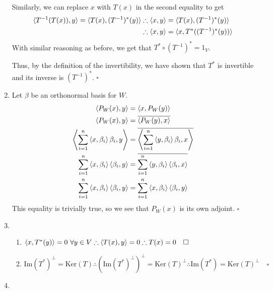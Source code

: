 \documentclass[12pt]{article}
\begin{document}
\begin{enumerate}
            Similarly, we can replace $x$ with $T(x)$ in the second equality to get
            \begin{align*}
                  \braket{T^{-1}(T(x)), y}=\braket{T(x), (T^{-1})^*(y)} & \therefore \braket{x, y}=\braket{T(x), (T^{-1})^*(y)}   \\
                                                                        & \therefore \braket{x, y}=\braket{x, T^*((T^{-1})^*(y))}
            \end{align*}
            With similar reasoning as before, we get that $T^* \circ (T^{-1})^*=\mathrm{1}_V$.

            Thus, by the definition of the invertibility, we have shown that $T^*$ is invertible
            and its inverse is $(T^{-1})^*$. $\square$

      \item Let $\beta$ be an orthonormal basis for $W$.
            \begin{gather*}
                  \braket{P_W(x), y} = \braket{x, P_W(y)} \\
                  \braket{P_W(x), y} = \overline{\braket{P_W(y), x}} \\
                  \Braket{\sum_{i=1}^{n} \braket{x, \beta_i}\beta_i, y} = \overline{\Braket{\sum_{i=1}^{n} \braket{y, \beta_i}\beta_i, x}} \\
                  \sum_{i=1}^{n} \braket{x, \beta_i}\braket{\beta_i, y} = \overline{\sum_{i=1}^{n} \braket{y, \beta_i}\braket{\beta_i, x}} \\
                  \sum_{i=1}^{n} \braket{x, \beta_i}\braket{\beta_i, y} = \sum_{i=1}^{n} \braket{x, \beta_i}\braket{\beta_i, y}
            \end{gather*}
            This equality is trivially true, so we see that $P_W(x)$ is its own adjoint. $\square$
      \item \begin{enumerate}
                  \item $\braket{x, T^*(y)}=0\ \forall y \in V \therefore \braket{T(x), y}=0 \therefore T(x)=0\quad\square$
                  \item $\text{Im}(T^*)^\perp = \text{Ker}(T) \therefore (\text{Im}(T^*)^\perp)^\perp = \text{Ker}(T)^\perp \therefore \text{Im}(T^*) = \text{Ker}(T)^\perp\quad\square$
            \end{enumerate}
      \item \begin{enumerate}
                  \setcounter{enumii}{2}

\end{enumerate}
\end{enumerate}
\end{document}
